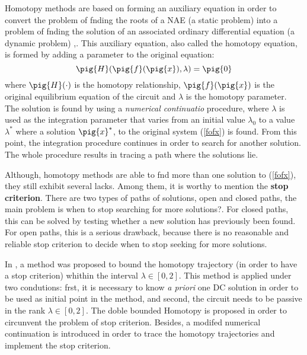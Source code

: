 \documentclass[conference]{IEEEtran}
\begin{document}
Homotopy methods are based on forming an auxiliary equation in order to
convert the problem of fnding the roots of a NAE (a static problem)
into
a problem of fnding the solution of an associated ordinary differential equation
(a dynamic problem)
\cite{homo_ogrodzki},\cite{cont_bra}. 
This auxiliary equation, also called the homotopy equation, is formed
by adding a parameter to the original equation:
\begin{equation}
\pig{H}(
\pig{f}(\pig{x}), \lambda
) = \pig{0}
\label{fofx2}
\end{equation}
where  $\pig{H}(\cdot)$ is the homotopy relationship, $\pig{f}(\pig{x})$ is the original equilibrium equation of
the circuit and $\lambda$ is the homotopy parameter.
The solution is found by using a {\it numerical continuatio} procedure, where
$\lambda$ is used as the integration parameter that varies from
an initial value
$\lambda_0$
to a value
$\lambda^{\ast}$ where a solution $\pig{x}^{\ast}$, to the original system
(\ref{fofx}) is found.
From this point, the integration procedure continues in order to search for
another solution.
The whole procedure results in tracing  a
path where the solutions lie.



Although, homotopy methods are able to fnd more than one solution to
(\ref{fofx}), they still exhibit several lacks. Among them, it is worthy to mention the {\bf stop criterion}. 
There are two types of paths of solutions,
open and closed paths, the main problem is when to stop searching for
more solutions?. For closed paths, this can be solved by testing whether
a new solution has previously been found. For open paths, this is a serious
drawback, because there is no reasonable and reliable stop criterion
to decide when to stop seeking for more solutions.





In \cite{homo_green}, a method was proposed  to bound the homotopy trajectory (in order to have a stop criterion) whithin the interval $\lambda \in [0,2]$.
This method is applied under two condutions: frst, it is necessary to know {\it a priori} one DC solution in order to be used
as initial point in the method, and second, the circuit needs to be passive in the rank $\lambda \in [0,2]$.
The doble bounded Homotopy is proposed in order to circunvent the problem of stop criterion. Besides, a modifed
numerical continuation is introduced in order to trace the homotopy trajectories and  implement the stop criterion.
\end{document}
